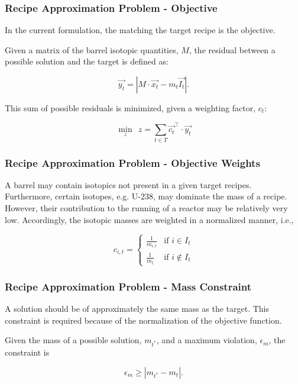 \begin{frame}[ctb!]
  \frametitle{Recipe Approximation Problem - Objective}

  In the current formulation, the matching the target recipe is the objective.

  Given a matrix of the barrel isotopic quantities, $M$, the residual between a
  possible solution and the target is defined as:
  
  \begin{equation}\label{eqs:residual}
    \vec{y_{t}} = \left| M \cdot \vec{x_{t}}  - m_t \vec{I_{t}} \right|.
  \end{equation}

  This sum of possible residuals is minimized, given a weighting factor, $c_t$:
  
  \begin{equation}\label{rap-obj}
    \min_{z} \:\: z = \sum_{t \in T} \vec{c_{t}}^{\top} \cdot \vec{y_{t}}
  \end{equation}
\end{frame}

\begin{frame}[ctb!]
  \frametitle{Recipe Approximation Problem - Objective Weights}

  A barrel may contain isotopics not present in a given target recipes.\\

  Furthermore, certain isotopes, e.g. U-238, may dominate the mass of a
  recipe. However, their contribution to the running of a reactor may be
  relatively very low. Accordingly, the isotopic masses are weighted in a
  normalized manner, i.e.,

  \begin{equation}\label{eqs:weights}
    c_{i,t} = 
    \begin{cases}
      \frac{1}{m_{i,t}} & \text{if } i \in I_{t} \\
      \frac{1}{m_{t}}   & \text{if } i \not\in I_{t}
    \end{cases}
  \end{equation}  
\end{frame}

\begin{frame}[ctb!]
  \frametitle{Recipe Approximation Problem - Mass Constraint}

  A solution should be of approximately the same mass as the target. This
  constraint is required because of the normalization of the objective function.

  Given the mass of a possible solution, $m_{t^*}$, and a maximum violation,
  $\epsilon_{m}$, the constraint is
  
  \begin{equation}\label{eqs:mass-constraint-simple}
    \epsilon_{m} \geq \left| m_{t^*} - m_{t} \right|.
  \end{equation}
\end{frame}

